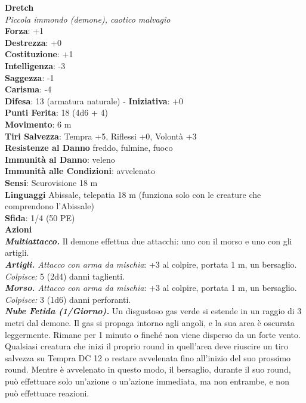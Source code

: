 \begin{multicols}{2}
\medskip\textbf{Dretch}\\
\emph{Piccola immondo (demone), caotico malvagio}\\
\textbf{Forza}: +1\\
\textbf{Destrezza}: +0\\
\textbf{Costituzione}: +1\\
\textbf{Intelligenza}: -3\\
\textbf{Saggezza}: -1\\
\textbf{Carisma}: -4\\
\textbf{Difesa}: 13 (armatura naturale) - \textbf{Iniziativa}: +0\\
\textbf{Punti Ferita}: 18 (4d6 + 4)\\
\textbf{Movimento}: 6 m\\
\textbf{Tiri Salvezza}: Tempra +5, Riflessi +0, Volontà +3\\
\textbf{Resistenze al Danno} freddo, fulmine, fuoco\\
\textbf{Immunità al Danno}: veleno\\
\textbf{Immunità alle Condizioni}: avvelenato\\
\textbf{Sensi}: Scurovisione 18 m\\
\textbf{Linguaggi} Abissale, telepatia 18 m (funziona solo con le creature che comprendono l'Abissale)\\
\textbf{Sfida}: 1/4 (50 PE)\smallskip\\
\smallskip\textbf{Azioni}\\
\emph{\textbf{Multiattacco.}} Il demone effettua due attacchi: uno con il morso e uno con gli artigli.\\
\emph{\textbf{Artigli.} Attacco con arma da mischia}: +3 al colpire, portata 1 m, un bersaglio.\\
\emph{Colpisce:} 5 (2d4) danni taglienti.\\
\emph{\textbf{Morso.} Attacco con arma da mischia}: +3 al colpire, portata 1 m, un bersaglio.\\
\emph{Colpisce:} 3 (1d6) danni perforanti.\\
\emph{\textbf{Nube Fetida (1/Giorno).}} Un disgustoso gas verde si estende in un raggio di 3 metri dal demone. Il gas si propaga intorno agli angoli, e la sua area è oscurata leggermente. Rimane per 1 minuto o finché non viene disperso da un forte vento. Qualsiasi creatura che inizi il proprio round in quell'area deve riuscire un tiro salvezza su Tempra DC  12 o restare avvelenata fino all'inizio del suo prossimo round. Mentre è avvelenato in questo modo, il bersaglio, durante il suo round, può effettuare solo un'azione o un'azione immediata, ma non entrambe, e non può effettuare reazioni.\\

\end{multicols}
